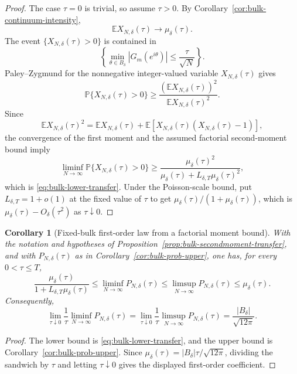 \documentclass[11pt]{amsart}
\numberwithin{equation}{section}
\newtheorem{corollary}[theorem]{Corollary}
\theoremstyle{definition}
\theoremstyle{remark}
\newcommand{\Prob}{\mathbb P}
\newcommand{\Exp}{\mathbb E}
\begin{document}
\begin{proof}
The case \(\tau=0\) is trivial, so assume \(\tau>0\).  By
Corollary~\ref{cor:bulk-continuum-intensity},
\[
  \Exp X_{N,\delta}(\tau)\longrightarrow \mu_\delta(\tau).
\]
The event \(\{X_{N,\delta}(\tau)>0\}\) is contained in
\[
  \left\{
    \min_{\theta\in B_\delta}|G_m(e^{i\theta})|\le \frac{\tau}{\sqrt N}
  \right\}.
\]
Paley--Zygmund for the nonnegative integer-valued variable
\(X_{N,\delta}(\tau)\) gives
\[
  \Prob\{X_{N,\delta}(\tau)>0\}
  \ge
  \frac{(\Exp X_{N,\delta}(\tau))^2}
       {\Exp X_{N,\delta}(\tau)^2}.
\]
Since
\[
  \Exp X_{N,\delta}(\tau)^2
  =
  \Exp X_{N,\delta}(\tau)
  +
  \Exp\!\left[
    X_{N,\delta}(\tau)(X_{N,\delta}(\tau)-1)
  \right],
\]
the convergence of the first moment and the assumed factorial second-moment
bound imply
\[
  \liminf_{N\to\infty}\Prob\{X_{N,\delta}(\tau)>0\}
  \ge
  \frac{\mu_\delta(\tau)^2}
       {\mu_\delta(\tau)+L_{\delta,T}\mu_\delta(\tau)^2},
\]
which is \eqref{eq:bulk-lower-transfer}.  Under the Poisson-scale bound, put
\(L_{\delta,T}=1+o(1)\) at the fixed value of \(\tau\) to get
\(\mu_\delta(\tau)/(1+\mu_\delta(\tau))\), which is
\(\mu_\delta(\tau)-O_\delta(\tau^2)\) as \(\tau\downarrow0\).
\end{proof}

\begin{corollary}[Fixed-bulk first-order law from a factorial moment bound]
\label{cor:bulk-firstorder-sandwich}
With the notation and hypotheses of
Proposition~\ref{prop:bulk-secondmoment-transfer}, and with
\(P_{N,\delta}(\tau)\) as in Corollary~\ref{cor:bulk-prob-upper}, one has, for
every \(0<\tau\le T\),
\[
  \frac{\mu_\delta(\tau)}
       {1+L_{\delta,T}\mu_\delta(\tau)}
  \le
  \liminf_{N\to\infty} P_{N,\delta}(\tau)
  \le
  \limsup_{N\to\infty} P_{N,\delta}(\tau)
  \le
  \mu_\delta(\tau).
\]
Consequently,
\[
  \lim_{\tau\downarrow0}
  \frac{1}{\tau}\liminf_{N\to\infty} P_{N,\delta}(\tau)
  =
  \lim_{\tau\downarrow0}
  \frac{1}{\tau}\limsup_{N\to\infty} P_{N,\delta}(\tau)
  =
  \frac{|B_\delta|}{\sqrt{12\pi}}.
\]
\end{corollary}

\begin{proof}
The lower bound is \eqref{eq:bulk-lower-transfer}, and the upper bound is
Corollary~\ref{cor:bulk-prob-upper}.  Since
\(\mu_\delta(\tau)=|B_\delta|\tau/\sqrt{12\pi}\), dividing the sandwich by
\(\tau\) and letting \(\tau\downarrow0\) gives the displayed first-order
coefficient.
\end{proof}
\end{document}
